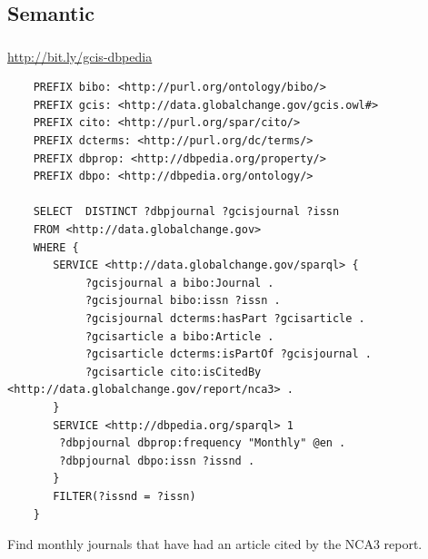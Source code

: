 \documentclass{beamer}
\begin{document}
\subsection{Semantic}

\begin{frame}[fragile]
    \frametitle{\insertsubsectionhead}
     \url{http://bit.ly/gcis-dbpedia}\\
\begin{tiny}
\begin{Verbatim}
    PREFIX bibo: <http://purl.org/ontology/bibo/>
    PREFIX gcis: <http://data.globalchange.gov/gcis.owl#>
    PREFIX cito: <http://purl.org/spar/cito/>
    PREFIX dcterms: <http://purl.org/dc/terms/>
    PREFIX dbprop: <http://dbpedia.org/property/>
    PREFIX dbpo: <http://dbpedia.org/ontology/>

    SELECT  DISTINCT ?dbpjournal ?gcisjournal ?issn
    FROM <http://data.globalchange.gov>
    WHERE {
       SERVICE <http://data.globalchange.gov/sparql> {
            ?gcisjournal a bibo:Journal .
            ?gcisjournal bibo:issn ?issn .
            ?gcisjournal dcterms:hasPart ?gcisarticle .
            ?gcisarticle a bibo:Article .
            ?gcisarticle dcterms:isPartOf ?gcisjournal .
            ?gcisarticle cito:isCitedBy <http://data.globalchange.gov/report/nca3> .
       }
       SERVICE <http://dbpedia.org/sparql> 1
        ?dbpjournal dbprop:frequency "Monthly" @en .
        ?dbpjournal dbpo:issn ?issnd .
       }
       FILTER(?issnd = ?issn)
    }
\end{Verbatim}
\end{tiny}
    Find monthly journals that have had an article cited by the NCA3 report.

\end{frame}
\end{document}
